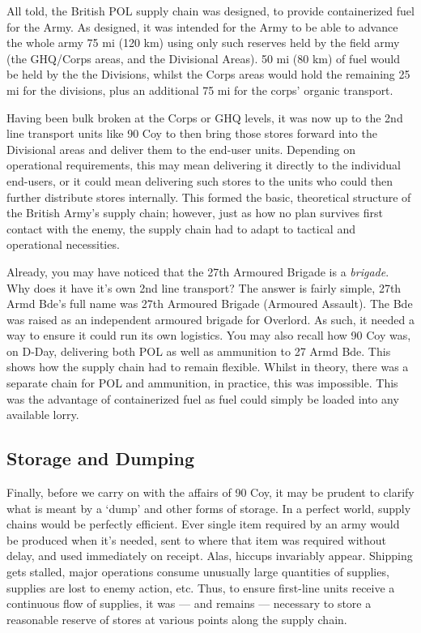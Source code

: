 \documentclass[noraggedright]{turabian-researchpaper}
\newcommand{\SupInWar}{Precis on Lecture ``Supplies in War'', (Part II)}
\begin{document}
All told, the British POL supply chain was designed, to provide containerized
fuel for the Army.  As designed, it was intended for the Army to be able to
advance the whole army 75 mi (120 km) using only such reserves held by the 
field army (the GHQ/Corps areas, and the Divisional Areas).  50 mi (80 km) 
of fuel would be held by the the Divisions, whilst the Corps areas would hold
the remaining 25 mi for the divisions, plus an additional 75 mi for the corps'
organic transport.\autocite[\SupInWar][3]{27course}

Having been bulk broken at the Corps or GHQ levels, it was now up to the 2nd
line transport units like 90 Coy to then bring those stores forward into the
Divisional areas and deliver them to the end-user units.  Depending on 
operational requirements, this may mean delivering it directly to the 
individual end-users, or it could mean delivering such stores to the units who 
could then further distribute stores internally.  This formed the basic, 
theoretical structure of the British Army's supply chain; however, just as how
no plan survives first contact with the enemy, the supply chain had to adapt
to tactical and operational necessities.  

Already, you may have noticed that the 27th Armoured Brigade is a 
\textit{brigade}.  Why does it have it's own 2nd line transport?  The answer
is fairly simple, 27th Armd Bde's full name was 27th Armoured Brigade 
(Armoured Assault). %
The Bde was raised as an independent armoured brigade for Overlord.  As such,
it needed a way to ensure it could run its own logistics.  You may also recall
how 90 Coy was, on D-Day, delivering both POL as well as ammunition to 27 Armd
Bde.  This shows how the supply chain had to remain flexible.  Whilst in 
theory, there was a separate chain for POL and ammunition, in practice, this
was impossible.  This was the advantage of containerized fuel as fuel could 
simply be loaded into any available lorry.

\subsection{Storage and Dumping}
Finally, before we carry on with the affairs of 90 Coy, it may be prudent to 
clarify what is meant by a `dump' and other forms of storage.  In a perfect 
world, supply chains would be perfectly efficient.  Ever single item required
by an army would be produced when it's needed, sent to where that item was 
required without delay, and used immediately on receipt.  Alas, hiccups 
invariably appear.  Shipping gets stalled, major operations consume unusually
large quantities of supplies, supplies are lost to enemy action, etc.  Thus,
to ensure first-line units receive a continuous flow of supplies, it was ---
and remains --- necessary to store a reasonable reserve of stores at various
points along the supply chain.  
\end{document}

